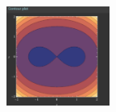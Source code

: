 \documentclass[a4paper,12pt]{article}
\begin{document}
\begin{figure}[h]
	\begin{center}
		\includegraphics[width=0.3\textwidth]{./contour.png}
	\end{center}
\end{figure}
\end{document}
